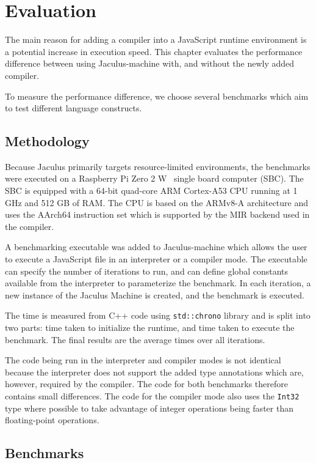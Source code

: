 \chapter{Evaluation}

The main reason for adding a compiler into a JavaScript runtime environment is a potential increase in execution speed. This chapter evaluates the performance difference between using Jaculus-machine with, and without the newly added compiler.

To measure the performance difference, we choose several benchmarks which aim to test different language constructs.

\section{Methodology}

Because Jaculus primarily targets resource-limited environments, the benchmarks were executed on a Raspberry Pi Zero 2 W~\cite{rpi0_datasheet} single board computer (SBC). The SBC is equipped with a 64-bit quad-core ARM Cortex-A53 CPU running at 1 GHz and 512 GB of RAM. The CPU is based on the ARMv8-A architecture and uses the AArch64 instruction set which is supported by the MIR backend used in the compiler.

A benchmarking executable was added to Jaculus-machine which allows the user to execute a JavaScript file in an interpreter or a compiler mode. The executable can specify the number of iterations to run, and can define global constants available from the interpreter to parameterize the benchmark. In each iteration, a new instance of the Jaculus Machine is created, and the benchmark is executed.

The time is measured from C++ code using \texttt{std::chrono} library and is split into two parts: time taken to initialize the runtime, and time taken to execute the benchmark. The final results are the average times over all iterations.

The code being run in the interpreter and compiler modes is not identical because the interpreter does not support the added type annotations which are, however, required by the compiler. The code for both benchmarks therefore contains small differences. The code for the compiler mode also uses the \texttt{Int32} type where possible to take advantage of integer operations being faster than floating-point operations.


\section{Benchmarks}


